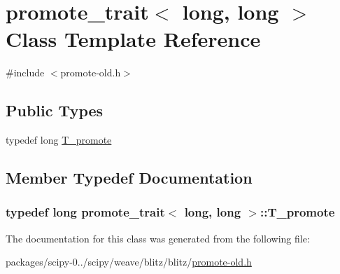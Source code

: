 \hypertarget{classpromote__trait_3_01long_00_01long_01_4}{}\section{promote\+\_\+trait$<$ long, long $>$ Class Template Reference}
\label{classpromote__trait_3_01long_00_01long_01_4}


{\ttfamily \#include $<$promote-\/old.\+h$>$}

\subsection*{Public Types}
\begin{DoxyCompactItemize}
\item 
typedef long \hyperlink{classpromote__trait_3_01long_00_01long_01_4_a724266b5607bcd36a9b1831cc93f65fe}{T\+\_\+promote}
\end{DoxyCompactItemize}


\subsection{Member Typedef Documentation}
\hypertarget{classpromote__trait_3_01long_00_01long_01_4_a724266b5607bcd36a9b1831cc93f65fe}{}
\subsubsection[{T\+\_\+promote}]{\setlength{\rightskip}{0pt plus 5cm}typedef long {\bf promote\+\_\+trait}$<$ long, long $>$\+::{\bf T\+\_\+promote}}\label{classpromote__trait_3_01long_00_01long_01_4_a724266b5607bcd36a9b1831cc93f65fe}


The documentation for this class was generated from the following file\+:\begin{DoxyCompactItemize}
\item 
packages/scipy-\/0../scipy/weave/blitz/blitz/\hyperlink{promote-old_8h}{promote-\/old.\+h}\end{DoxyCompactItemize}
